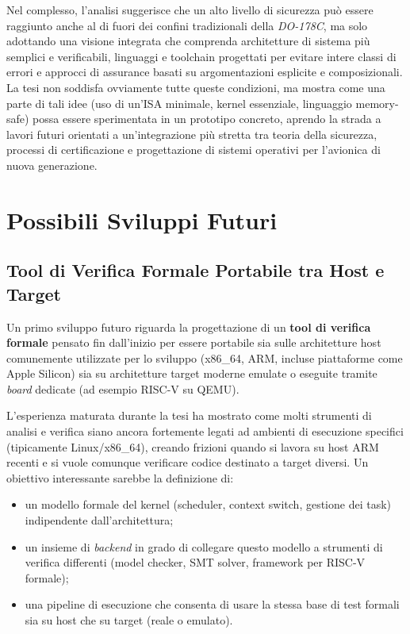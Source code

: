 \documentclass[italian, Lau, oneside]{sapthesis} %
\begin{document}
Nel complesso, l’analisi suggerisce che un alto livello di sicurezza può essere raggiunto anche al di fuori dei confini tradizionali della \textit{DO-178C}, ma solo adottando una visione integrata che comprenda architetture di sistema più semplici e verificabili, linguaggi e toolchain progettati per evitare intere classi di errori e approcci di assurance basati su argomentazioni esplicite e composizionali. La tesi non soddisfa ovviamente tutte queste condizioni, ma mostra come una parte di tali idee (uso di un'ISA minimale, kernel essenziale, linguaggio memory-safe) possa essere sperimentata in un prototipo concreto, aprendo la strada a lavori futuri orientati a un’integrazione più stretta tra teoria della sicurezza, processi di certificazione e progettazione di sistemi operativi per l’avionica di nuova generazione.

\section{Possibili Sviluppi Futuri}

\subsection*{Tool di Verifica Formale Portabile tra Host e Target}

Un primo sviluppo futuro riguarda la progettazione di un \textbf{tool di verifica formale} pensato fin dall’inizio per essere portabile sia sulle architetture host comunemente utilizzate per lo sviluppo (x86\_64, ARM, incluse piattaforme come Apple Silicon) sia su architetture target moderne emulate o eseguite tramite \textit{board} dedicate (ad esempio RISC-V su QEMU).  

L’esperienza maturata durante la tesi ha mostrato come molti strumenti di analisi e verifica siano ancora fortemente legati ad ambienti di esecuzione specifici (tipicamente Linux/x86\_64), creando frizioni quando si lavora su host ARM recenti e si vuole comunque verificare codice destinato a target diversi. Un obiettivo interessante sarebbe la definizione di:
\begin{itemize}
    \item un modello formale del kernel (scheduler, context switch, gestione dei task) indipendente dall’architettura;
    \item un insieme di \textit{backend} in grado di collegare questo modello a strumenti di verifica differenti (model checker, SMT solver, framework per RISC-V formale);
    \item una pipeline di esecuzione che consenta di usare la stessa base di test formali sia su host che su target (reale o emulato).
\end{itemize}
\end{document}
